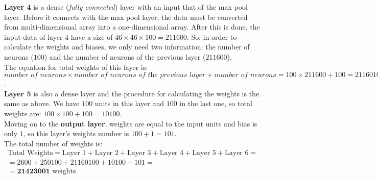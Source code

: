 \textbf{Layer 4} is a dense (\textit{fully connected}) layer with an input that of the max pool layer. Before it connects with the max pool layer, the data must be converted from multi-dimensional array into a one-dimensional array.
After this is done, the input data of layer 4 have a size of $46 \times 46 \times 100 = \num{211600}$. So, in order to calculate the weights and biases, we only need two information: the number of neurons ($100$) and the number of neurons of the previous layer ($\num{211600}$).\\
The equation for total weights of this layer is: \\
$\textit{number of neurons} \times \textit{number of neurons of the previous layer} + \textit{number of neurons} = 100 \times 211600 + 100 = 21160100$. \\ 

\textbf{Layer 5} is also a dense layer and the procedure for calculating the weights is the same as above. 
We have $100$ units in this layer and $100$ in the last one, so total weights are: $100 \times 100 + 100 = \num{10100}$. \\

Moving on to the \textbf{output layer}, weights are equal to the input units and bias is only $1$, so this layer's weights number is $100 +1 = 101$. \\ 

The total number of weights is:
\[
\begin{gathered}
\text{Total Weights} = \text{Layer 1} + \text{Layer 2} + \text{Layer 3} + \text{Layer 4} + \text{Layer 5} + \text{Layer 6} = \\
= \num{2600} + \num{250100} + \num{21160100} + \num{10100} + \num{101} = \\  =\mathbf{\num{21423001}} \text{ weights}
\end{gathered}
\]
\vspace{3mm}